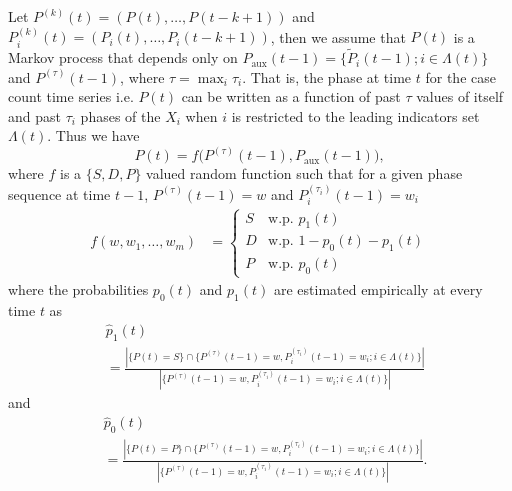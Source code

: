 \documentclass[conference,compsoc]{IEEEtran}
\newcommand{\Paux}{P_{\textrm{aux}}}
\begin{document}
Let $ P^{(k)}(t) = (P(t), \dots, P(t-k+1))$ and $P^{(k)}_i(t) =\left(P_i(t), \dots, P_i(t-k+1)\right)$,  then we assume that $P(t)$ is a Markov process that depends only on   $\Paux(t-1) = \{\tilde P_i(t-1); i\in \Lambda(t)\}$ and $ P^{(\tau)}(t-1)$, where $\tau =\max_i \tau_i$. That is, the phase at time $t$ for the case count time series i.e. $P(t)$ can be written as a function of past $\tau$ values of itself and past $\tau_i$ phases of the $X_i$ when $i$ is restricted to the leading indicators set $\Lambda(t)$. Thus we have 
\begin{equation}
    P(t) = f\big( P^{(\tau)}(t-1), \Paux(t-1) \big),
\end{equation}
where $f$ is a $ \{S, D, P\} $ valued random function such that for a given phase sequence at time $t-1$,  $P^{(\tau)}(t-1) = w$ and $ P^{(\tau_i)}_i(t-1) =w_i$ 
\begin{align*}
    f(w, w_1, \dots, w_m) 
    &= \begin{cases}
    S & \text{w.p. } p_1(t) \\
    D& \text{w.p. } 1-p_0(t)-p_1(t)\\
    P& \text{w.p. } p_0(t) 
    \end{cases}
\end{align*}
where the probabilities $p_0(t)$ and $ p_1(t)$ are estimated empirically at every time $t$ as
{\footnotesize
\begin{align*}
    &\hat{p}_1(t) \\
    & =\frac{ |\{P(t) = S\}\cap \{P^{(\tau)}(t-1) =w, P^{(\tau_i)}_i(t-1) =w_i;i\in \Lambda(t)\} |} {| \{P^{(\tau)}(t-1) =w, P^{(\tau_i)}_i(t-1) =w_i;i\in \Lambda(t)\} |}
\end{align*} }
and 
{\footnotesize
\begin{align*}
    &\hat{p}_0(t) \\
    & =\frac{ |\{P(t) = P\}\cap \{P^{(\tau)}(t-1) =w, P^{(\tau_i)}_i(t-1) =w_i;i\in \Lambda(t)\} |} {| \{P^{(\tau)}(t-1) =w, P^{(\tau_i)}_i(t-1) =w_i;i\in \Lambda(t)\} |}.
\end{align*} }
\end{document}
